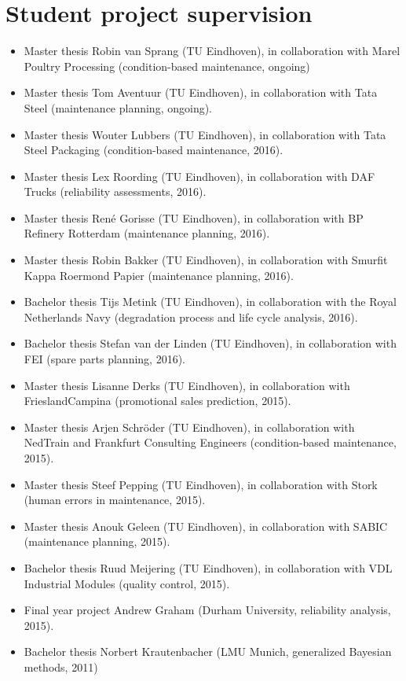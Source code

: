 \documentclass[a4paper]{simplecv}
\begin{document}
\section{Student project supervision}
\label{supervision}

\begin{itemize}
\item Master thesis Robin van Sprang (TU Eindhoven),
in collaboration with Marel Poultry Processing (condition-based maintenance, ongoing)
\item Master thesis Tom Aventuur (TU Eindhoven),
in collaboration with Tata Steel (maintenance planning, ongoing).
\item Master thesis Wouter Lubbers (TU Eindhoven),
in collaboration with Tata Steel Packaging (condition-based maintenance, 2016).
\item Master thesis Lex Roording (TU Eindhoven),
in collaboration with DAF Trucks (reliability assessments, 2016).
\item Master thesis Ren\'{e} Gorisse (TU Eindhoven),
in collaboration with BP Refinery Rotterdam (maintenance planning, 2016).
\item Master thesis Robin Bakker (TU Eindhoven),
in collaboration with Smurfit Kappa Roermond Papier (maintenance planning, 2016).
\item Bachelor thesis Tijs Metink (TU Eindhoven),
in collaboration with the Royal Netherlands Navy (degradation process and life cycle analysis, 2016).
\item Bachelor thesis Stefan van der Linden (TU Eindhoven),
in collaboration with FEI (spare parts planning, 2016).
\item Master thesis Lisanne Derks (TU Eindhoven),
in collaboration with FrieslandCampina (promotional sales prediction, 2015).
\item Master thesis Arjen Schr\"{o}der (TU Eindhoven),
in collaboration with NedTrain and Frankfurt Consulting Engineers (condition-based maintenance, 2015).
\item Master thesis Steef Pepping (TU Eindhoven),
in collaboration with Stork (human errors in maintenance, 2015).
\item Master thesis Anouk Geleen (TU Eindhoven),
in collaboration with SABIC (maintenance planning, 2015).
\item Bachelor thesis Ruud Meijering (TU Eindhoven),
in collaboration with VDL Industrial Modules (quality control, 2015).
\item Final year project Andrew Graham (Durham University, reliability analysis, 2015).
\item Bachelor thesis Norbert Krautenbacher (LMU Munich, generalized Bayesian methods, 2011)
\end{itemize}
\end{document}
